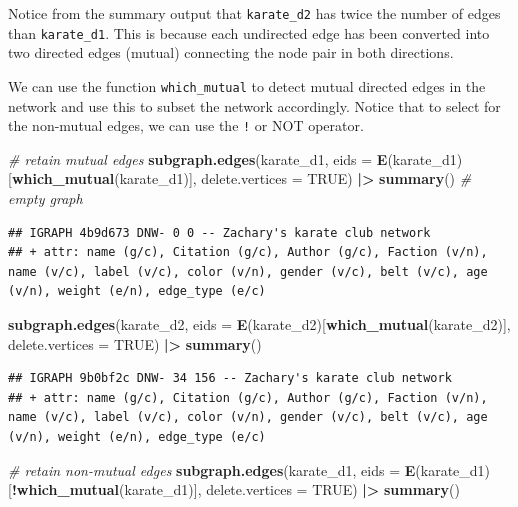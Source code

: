 \documentclass[
]{book}
\newenvironment{Shaded}{\begin{snugshade}}{\end{snugshade}}
\newcommand{\AttributeTok}[1]{\textcolor[rgb]{0.13,0.29,0.53}{#1}}
\newcommand{\CommentTok}[1]{\textcolor[rgb]{0.56,0.35,0.01}{\textit{#1}}}
\newcommand{\ConstantTok}[1]{\textcolor[rgb]{0.56,0.35,0.01}{#1}}
\newcommand{\FunctionTok}[1]{\textcolor[rgb]{0.13,0.29,0.53}{\textbf{#1}}}
\newcommand{\NormalTok}[1]{#1}
\newcommand{\SpecialCharTok}[1]{\textcolor[rgb]{0.81,0.36,0.00}{\textbf{#1}}}
\begin{document}
Notice from the summary output that \texttt{karate\_d2} has twice the number of edges than \texttt{karate\_d1}. This is because each undirected edge has been converted into two directed edges (mutual) connecting the node pair in both directions.

We can use the function \texttt{which\_mutual} to detect mutual directed edges in the network and use this to subset the network accordingly. Notice that to select for the non-mutual edges, we can use the \texttt{!} or NOT operator.

\begin{Shaded}
\begin{Highlighting}[]
\CommentTok{\# retain mutual edges }
\FunctionTok{subgraph.edges}\NormalTok{(karate\_d1, }\AttributeTok{eids =} \FunctionTok{E}\NormalTok{(karate\_d1)[}\FunctionTok{which\_mutual}\NormalTok{(karate\_d1)], }\AttributeTok{delete.vertices =} \ConstantTok{TRUE}\NormalTok{) }\SpecialCharTok{|\textgreater{}} 
  \FunctionTok{summary}\NormalTok{() }\CommentTok{\# empty graph}
\end{Highlighting}
\end{Shaded}

\begin{verbatim}
## IGRAPH 4b9d673 DNW- 0 0 -- Zachary's karate club network
## + attr: name (g/c), Citation (g/c), Author (g/c), Faction (v/n), name (v/c), label (v/c), color (v/n), gender (v/c), belt (v/c), age (v/n), weight (e/n), edge_type (e/c)
\end{verbatim}

\begin{Shaded}
\begin{Highlighting}[]
\FunctionTok{subgraph.edges}\NormalTok{(karate\_d2, }\AttributeTok{eids =} \FunctionTok{E}\NormalTok{(karate\_d2)[}\FunctionTok{which\_mutual}\NormalTok{(karate\_d2)], }\AttributeTok{delete.vertices =} \ConstantTok{TRUE}\NormalTok{) }\SpecialCharTok{|\textgreater{}} 
  \FunctionTok{summary}\NormalTok{()}
\end{Highlighting}
\end{Shaded}

\begin{verbatim}
## IGRAPH 9b0bf2c DNW- 34 156 -- Zachary's karate club network
## + attr: name (g/c), Citation (g/c), Author (g/c), Faction (v/n), name (v/c), label (v/c), color (v/n), gender (v/c), belt (v/c), age (v/n), weight (e/n), edge_type (e/c)
\end{verbatim}

\begin{Shaded}
\begin{Highlighting}[]
\CommentTok{\# retain non{-}mutual edges }
\FunctionTok{subgraph.edges}\NormalTok{(karate\_d1, }\AttributeTok{eids =} \FunctionTok{E}\NormalTok{(karate\_d1)[}\SpecialCharTok{!}\FunctionTok{which\_mutual}\NormalTok{(karate\_d1)], }\AttributeTok{delete.vertices =} \ConstantTok{TRUE}\NormalTok{) }\SpecialCharTok{|\textgreater{}} 
  \FunctionTok{summary}\NormalTok{()}
\end{Highlighting}
\end{Shaded}
\end{document}
